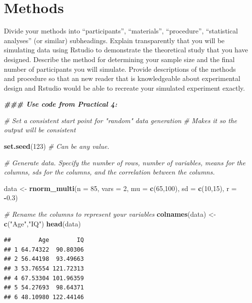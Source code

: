 \documentclass[
]{book}
\newenvironment{Shaded}{\begin{snugshade}}{\end{snugshade}}
\newcommand{\AttributeTok}[1]{\textcolor[rgb]{0.13,0.29,0.53}{#1}}
\newcommand{\CommentTok}[1]{\textcolor[rgb]{0.56,0.35,0.01}{\textit{#1}}}
\newcommand{\DecValTok}[1]{\textcolor[rgb]{0.00,0.00,0.81}{#1}}
\newcommand{\DocumentationTok}[1]{\textcolor[rgb]{0.56,0.35,0.01}{\textbf{\textit{#1}}}}
\newcommand{\FloatTok}[1]{\textcolor[rgb]{0.00,0.00,0.81}{#1}}
\newcommand{\FunctionTok}[1]{\textcolor[rgb]{0.13,0.29,0.53}{\textbf{#1}}}
\newcommand{\NormalTok}[1]{#1}
\newcommand{\OtherTok}[1]{\textcolor[rgb]{0.56,0.35,0.01}{#1}}
\newcommand{\SpecialCharTok}[1]{\textcolor[rgb]{0.81,0.36,0.00}{\textbf{#1}}}
\newcommand{\StringTok}[1]{\textcolor[rgb]{0.31,0.60,0.02}{#1}}
\begin{document}
\section*{Methods}\label{methods}

Divide your methods into ``participants'', ``materials'', ``procedure'', ``statistical analyses'' (or similar) subheadings. Explain transparently that you will be simulating data using Rstudio to demonstrate the theoretical study that you have designed. Describe the method for determining your sample size and the final number of participants you will simulate. Provide descriptions of the methods and procedure so that an new reader that is knowledgeable about experimental design and Rstudio would be able to recreate your simulated experiment exactly.

\begin{Shaded}
\begin{Highlighting}[]
\DocumentationTok{\#\#\# Use code from Practical 4: }

\CommentTok{\# Set a consistent start point for "random" data generation}
\CommentTok{\# Makes it so the output will be consistent}

\FunctionTok{set.seed}\NormalTok{(}\DecValTok{123}\NormalTok{) }\CommentTok{\# Can be any value. }

\CommentTok{\# Generate data. Specify the number of rows, number of variables, means for the columns, sd\textquotesingle{}s for the columns, and the correlation between the columns.}

\NormalTok{data }\OtherTok{\textless{}{-}} \FunctionTok{rnorm\_multi}\NormalTok{(}\AttributeTok{n =} \DecValTok{85}\NormalTok{, }\AttributeTok{vars =} \DecValTok{2}\NormalTok{, }\AttributeTok{mu =} \FunctionTok{c}\NormalTok{(}\DecValTok{65}\NormalTok{,}\DecValTok{100}\NormalTok{), }\AttributeTok{sd =} \FunctionTok{c}\NormalTok{(}\DecValTok{10}\NormalTok{,}\DecValTok{15}\NormalTok{), }\AttributeTok{r =} \SpecialCharTok{{-}}\FloatTok{0.3}\NormalTok{)}

\CommentTok{\# Rename the columns to represent your variables }
\FunctionTok{colnames}\NormalTok{(data) }\OtherTok{\textless{}{-}} \FunctionTok{c}\NormalTok{(}\StringTok{"Age"}\NormalTok{,}\StringTok{"IQ"}\NormalTok{)}
\FunctionTok{head}\NormalTok{(data)}
\end{Highlighting}
\end{Shaded}

\begin{verbatim}
##        Age        IQ
## 1 64.74322  90.80306
## 2 56.44198  93.49663
## 3 53.76554 121.72313
## 4 67.53304 101.96359
## 5 54.27693  98.64371
## 6 48.10980 122.44146
\end{verbatim}
\end{document}
